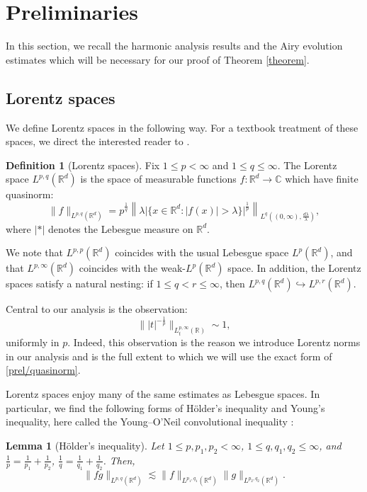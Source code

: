 \documentclass[10pt, reqno]{amsart}
\numberwithin{equation}{section}
\newcommand{\R}{\mathbb{R}}
\newtheorem{lemma}[theorem]{Lemma}
\theoremstyle{definition}
\newtheorem{definition}[theorem]{Definition}
\theoremstyle{remark}
\begin{document}
\section{Preliminaries}\label{section:linear estimate}
In this section, we recall the harmonic analysis results and the Airy evolution estimates which will be necessary for our proof of Theorem \ref{theorem}.
\subsection{Lorentz spaces}
We define Lorentz spaces in the following way. For a textbook treatment of these spaces, we direct the interested reader to \cite{Grafa14}.
    
    \begin{definition}[Lorentz spaces] Fix $1\leq p<\infty$ and $1\leq q\leq\infty$. The Lorentz space $L^{p,q}(\R^d)$ is the space of measurable functions $f:\R^d \to \mathbb{C}$ which have finite quasinorm:
    \begin{equation}\label{prel/quasinorm}
        \|f\|_{L^{p,q}(\R^d)}=p^{\frac{1}{q}}\left\| \lambda \big| \{x\in \R^d: |f(x)|>\lambda \}\big|^{\frac{1}{p}} \right\|_{L^{q}((0, \infty), \frac{d\lambda}{\lambda})},
    \end{equation}
    where $|*|$ denotes the Lebesgue measure on $\R^d$.
    \end{definition}
    
    We note that $L^{p,p}(\R^d)$ coincides with the usual Lebesgue space $L^{p}(\R^d)$, and that $L^{p,\infty}(\R^d)$ coincides with the weak-$L^{p}(\R^d)$ space. In addition, the Lorentz spaces satisfy a natural nesting: if $1\leq q<r\leq\infty$, then $L^{p,q}(\R^d) \hookrightarrow  L^{p,r}(\R^d)$.

    Central to our analysis is the observation:
    \begin{equation*}
        \big\||t|^{-\frac{1}{p}}\big\|_{L_t^{p,\infty}(\R)} \sim 1,
    \end{equation*}
    uniformly in $p$. Indeed, this observation is the reason we introduce Lorentz norms in our analysis and is the full extent to which we will use the exact form of \eqref{prel/quasinorm}.
    
    Lorentz spaces enjoy many of the same estimates as Lebesgue spaces. In particular, we find the following forms of H\"older's inequality and Young's inequality, here called the Young--O'Neil convolutional inequality \cite{young-oneil-proof,lorentz-strichartz,young-oneil-introduction}:
    \begin{lemma}[H\"older's inequality] Let $1\leq p,p_1,p_2<\infty$, $1\leq q,q_1,q_2\leq\infty$, and $\frac{1}{p}=\frac{1}{p_1}+\frac{1}{p_2}$, $\frac{1}{q}=\frac{1}{q_1}+\frac{1}{q_2}$. Then,
    $$\|fg\|_{L^{p,q}(\R^d)}\lesssim \|f\|_{L^{p_1,q_1}(\R^d)}\|g\|_{L^{p_2,q_2}(\R^d)}.$$
    \end{lemma}
    
\end{document}
